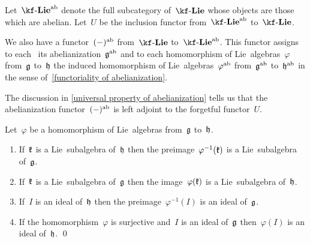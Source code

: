 \begin{remark}
  Let~$\cLie{\kf}^{\ab}$ denote the full subcategory of~$\cLie{\kf}$ whose objects are those~\liealgebras{$\kf$} which are abelian.
  Let~$U$ be the inclusion functor from~$\cLie{\kf}^{\ab}$ to~$\cLie{\kf}$.

  We also have a functor~$(-)^{\mathrm{ab}}$ from~$\cLie{\kf}$ to~$\cLie{\kf}^{\ab}$.
  This functor assigns to each~\liealgebra{$\kf$} its abelianization~$\mathfrak{g}^{\mathrm{ab}}$ and to each homomorphism of Lie~algebras~$\varphi$ from~$\mathfrak{g}$ to~$\mathfrak{h}$ the induced homomorphism of Lie~algebras~$\varphi^{\mathrm{ab}}$ from~$\mathfrak{g}^{\mathrm{ab}}$ to~$\mathfrak{h}^{\mathrm{ab}}$ in the sense of~\cref{functoriality of abelianization}.

  The discussion in \cref{universal property of abelianization} tells us that the abelianization functor~$(-)^{\mathrm{ab}}$ is left adjoint to the forgetful functor~$U$.
\end{remark}




\begin{lemma}
  Let~$\varphi$ be a homomorphism of Lie~algebras from~$\mathfrak{g}$ to~$\mathfrak{h}$.
  \begin{enumerate}
    \item
      If~$\mathfrak{k}$ is a Lie~subalgebra of~$\mathfrak{h}$ then the preimage~$\varphi^{-1}(\mathfrak{k})$ is a Lie~subalgebra of~$\mathfrak{g}$.
    \item
      If~$\mathfrak{k}$ is a Lie~subalgebra of~$\mathfrak{g}$ then the image~$\varphi(\mathfrak{k})$ is a Lie~subalgebra of~$\mathfrak{h}$.
    \item
      If~$I$ is an ideal of~$\mathfrak{h}$ then the preimage~$\varphi^{-1}(I)$ is an ideal of~$\mathfrak{g}$.
    \item
      If the homomorphism~$\varphi$ is surjective and~$I$ is an ideal of~$\mathfrak{g}$ then~$\varphi(I)$ is an ideal of~$\mathfrak{h}$.
    \qed
  \end{enumerate}
\end{lemma}


